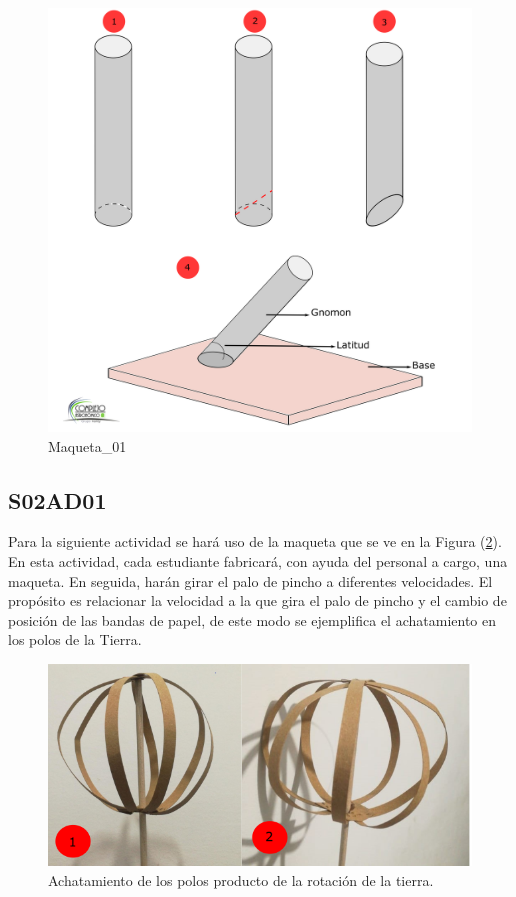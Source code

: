\documentclass[10pt,a4paper]{article}
\begin{document}
\begin{figure}[H]
\centering
\includegraphics[scale=0.05]{Imagenes/Maqueta_01} 
\caption{Maqueta\_01}
\label{maqueta_01}
\end{figure} 

\subsection{S02AD01}
Para la siguiente actividad se hará uso de la maqueta que se ve en la Figura (\ref{Achatamiento_02}). En esta actividad, cada estudiante fabricará, con ayuda del personal a cargo, una maqueta. En seguida, harán girar el palo de pincho a diferentes velocidades. El propósito es relacionar la velocidad a la que gira el palo de pincho y el cambio de posición de las bandas de papel, de este modo se ejemplifica el achatamiento en los polos de la Tierra.

\begin{figure}[H]
\centering
\includegraphics[scale=0.5]{Imagenes/Achatamiento_02.png} 
\caption{Achatamiento de los polos producto de la rotación de la tierra.}
\label{Achatamiento_02}
\end{figure} 
\end{document}
